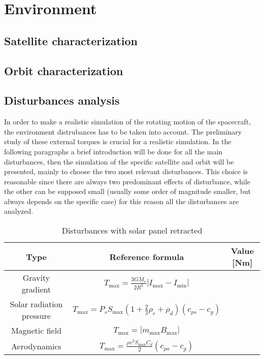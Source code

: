 \section{Environment}
\label{sec:environment}

\subsection{Satellite characterization }
\label{subsec:sat_characterization}


\subsection{Orbit characterization}
\label{subsec:orbit_characterization}

\subsection{Disturbances analysis}
\label{subsec:disturbances_analysis}
In order to make a realistic simulation of the rotating motion of the spacecraft, the environment 
distrubances has to be taken into account. The preliminary study of these external torques is 
crucial for a realistic simulation. In the following paragraphs a brief introduction will be 
done for all the main disturbances, then the simulation of the specific satellite and orbit
will be presented, mainly to choose the two most relevant disturbances. This choice is reasonable 
since there are always two predominant effects of disturbance, while the other can be supposed small 
(usually some order of magnitude smaller, but always depends on the specific case) for this reason
all the disturbances are analyzed. 

\begin{table}[ht]
	\centering
	\begin{tabular}{|c|c|c|}
		\hline
		Type & Reference formula & Value [Nm] \\ \hline
		Gravity gradient & \( T_{\text{max}} = \frac{3G M_e}{2R^3} |I_{\text{max}} - I_{\text{min}}| \) & \\ \hline
		Solar radiation pressure & \( T_{\text{max}} = P_s S_{\text{max}} \left(1 + \frac{2}{3} \rho_r + \rho_d \right) (c_{ps} - c_g) \) & \\ \hline
		Magnetic field & \( T_{\text{max}} = |m_{\text{max}} B_{\text{max}}| \) & \\ \hline
		Aerodynamics & \( T_{\text{max}} = \frac{\rho v^2 S_{\text{max}} C_d}{2} (c_{pa} - c_g) \) & \\ \hline
	\end{tabular}
	\caption{Disturbances with solar panel retracted}
	\label{tab:torque_values}
\end{table}


